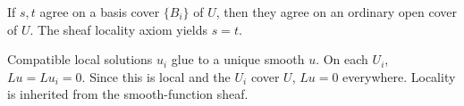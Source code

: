 \begin{solution}
If $s,t$ agree on a basis cover $\{B_i\}$ of $U$, then they agree on an ordinary open cover of $U$. The sheaf locality axiom yields $s=t$.
\end{solution}

\begin{solution}
Compatible local solutions $u_i$ glue to a unique smooth $u$. On each $U_i$, $Lu=Lu_i=0$. Since this is local and the $U_i$ cover $U$, $Lu=0$ everywhere. Locality is inherited from the smooth-function sheaf.
\end{solution}